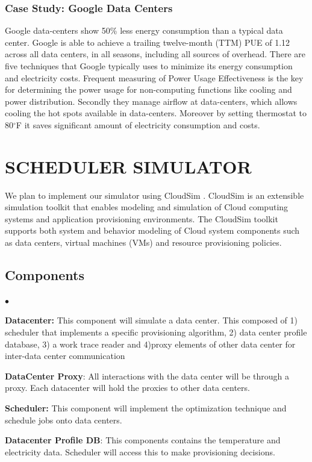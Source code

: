 \documentclass[letterpaper,twocolumn,12pt]{article}
\newenvironment{list2}{
  \begin{list}{$\bullet$}{%
      \setlength{\itemsep}{0in}
      \setlength{\parsep}{0in} \setlength{\parskip}{0in}
      \setlength{\topsep}{0in} \setlength{\partopsep}{0in}
      \setlength{\leftmargin}{0.2in}}}{\end{list}}
\begin{document}
\subsubsection{Case Study: Google Data Centers} \label{sec:CSgoogle}
Google data-centers show 50\% less energy consumption than a typical data center. Google is able to achieve a trailing twelve-month (TTM) PUE of 1.12 across all data centers, in all seasons, including all sources of overhead.
There are five techniques that Google typically uses to minimize its energy consumption and electricity costs. Frequent measuring of Power Usage Effectiveness is the key for determining the power usage for non-computing functions like cooling and power distribution. Secondly they manage airflow at data-centers, which allows cooling the hot spots available in data-centers. Moreover by setting thermostat to 80$^{\circ}$F it saves significant amount of electricity consumption and costs.



\section{SCHEDULER SIMULATOR} 
We plan to implement our simulator using CloudSim \cite{calheiros2011cloudsim}. CloudSim is an extensible simulation toolkit that enables modeling and simulation of Cloud computing systems and application provisioning environments. The CloudSim toolkit supports both system and behavior modeling of Cloud system components such as data centers, virtual machines (VMs) and resource provisioning policies.
\subsection{Components}
\begin{list2} %
\item \textbf{Datacenter:} This component will simulate a data center. This composed of 1) scheduler that implements a specific provisioning algorithm, 2) data center profile database, 3) a work trace reader and 4)proxy elements of other data center for inter-data center communication\
\item \textbf{DataCenter Proxy}: All interactions with the data center will be through a proxy. Each datacenter will hold the proxies to other data centers.\
\item \textbf{Scheduler:} This component will implement the optimization technique and schedule jobs onto data centers.\
\item \textbf{Datacenter Profile DB}: This components contains the temperature and electricity data. Scheduler will access this to make provisioning decisions.\
\end{list2}
\end{document}
